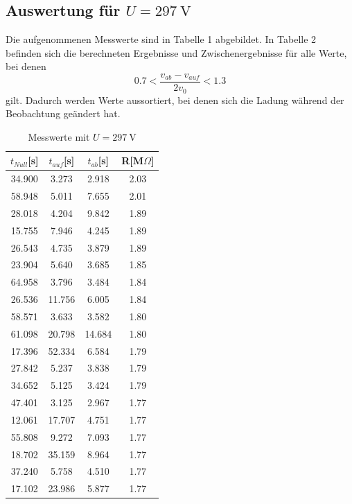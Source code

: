 \documentclass[11pt,ngerman,a4paper]{article}
\begin{document}
\subsection{Auswertung für $U=\SI{297}{\volt}$}
Die aufgenommenen Messwerte sind in Tabelle 1 abgebildet. In Tabelle 2 befinden sich die berechneten Ergebnisse und Zwischenergebnisse für alle Werte, bei denen
\begin{equation}
0.7 < \frac{v_{ab}-v_{auf}}{2 v_0} < 1.3
\end{equation}
gilt. Dadurch werden Werte aussortiert, bei denen sich die Ladung während der Beobachtung geändert hat.
\begin{table}[H]
\centering
\begin{tabular}{cccc}
\toprule
{$t_{Null}$[s]} &{ $t_{auf}$[s]} &{ $t_{ab}$[s]} &{ R[M$\Omega$] }\\
\midrule
34.900 & 3.273 & 2.918 & 2.03\\
58.948 & 5.011 & 7.655 & 2.01\\
28.018 & 4.204 & 9.842 & 1.89\\
15.755 & 7.946 & 4.245 & 1.89\\
26.543 & 4.735 & 3.879 & 1.89\\
23.904 & 5.640 & 3.685 & 1.85\\
64.958 & 3.796 & 3.484 & 1.84\\
26.536 & 11.756 & 6.005 & 1.84\\
58.571 & 3.633 & 3.582 & 1.80\\
61.098 & 20.798 & 14.684 & 1.80\\
17.396 & 52.334 & 6.584 & 1.79\\
27.842 & 5.237 & 3.838 & 1.79\\
34.652 & 5.125 & 3.424 & 1.79\\
47.401 & 3.125 & 2.967 & 1.77\\
12.061 & 17.707 & 4.751 & 1.77\\
55.808 & 9.272 & 7.093 & 1.77\\
18.702 & 35.159 & 8.964 & 1.77\\
37.240 & 5.758 & 4.510 & 1.77\\
17.102 & 23.986 & 5.877 & 1.77\\
\bottomrule
\end{tabular}
\label{}
\caption{Messwerte mit $U=\SI{297}{\volt}$}
\end{table}
\end{document}
